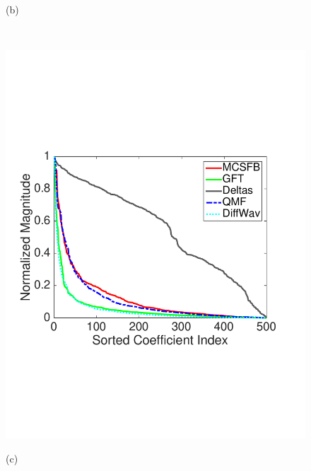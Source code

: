 \documentclass[journal, 10pt]{IEEEtran}
\begin{document}
\begin{figure}[tbh]
\begin{minipage}[m]{0.48\linewidth}
\centerline{\small{(b)}}
\end{minipage} \\
\vspace{.07in}
\begin{minipage}[m]{0.48\linewidth}
\centerline{\includegraphics[width=.96\linewidth]{fig_comp_coeff2}}
\centerline{\small{(c)}}
\end{minipage}
\begin{minipage}[m]{0.48\linewidth}

\end{minipage}
\end{figure}
\end{document}
